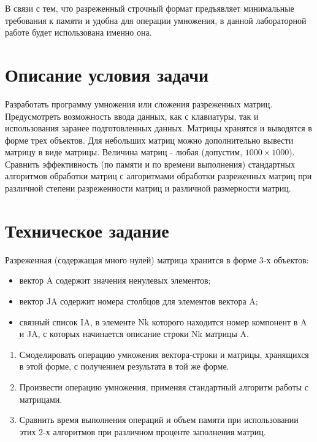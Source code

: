 В связи с тем, что разреженный строчный формат предъявляет минимальные требования к памяти и удобна для операции умножения, в данной лабораторной работе будет использована именно она.

\section{Описание условия задачи}

Разработать  программу  умножения  или  сложения  разреженных  матриц. 
Предусмотреть  возможность  ввода  данных,  как  с  клавиатуры,  так  и  использования 
заранее  подготовленных  данных.  Матрицы  хранятся  и  выводятся  в  форме  трех 
объектов.  Для  небольших  матриц  можно  дополнительно  вывести  матрицу  в  виде 
матрицы. Величина матриц -  любая (допустим, $1000\times1000$). Сравнить эффективность 
(по памяти и по времени выполнения) стандартных алгоритмов обработки матриц с 
алгоритмами обработки разреженных матриц при различной степени разреженности 
матриц и различной размерности матриц.

\section{Техническое задание}

Разреженная (содержащая много нулей) матрица хранится в форме 3-х объектов:
\begin{itemize}[$\bullet$]
	\item вектор A содержит значения ненулевых элементов; 
	\item вектор JA содержит номера столбцов для элементов вектора A; 
	\item связный список IA, в элементе Nk которого находится номер компонент 
	в A и JA, с которых начинается описание строки Nk матрицы A. 
\end{itemize}

\begin{enumerate}
	\item Смоделировать операцию умножения вектора-строки и матрицы, 
	хранящихся в этой форме, с получением результата в той же форме. 
	\item Произвести операцию умножения, применяя стандартный алгоритм работы с 
	матрицами. 
	\item Сравнить время выполнения операций и объем памяти при использовании 
	этих 2-х алгоритмов при различном проценте заполнения матриц. 
\end{enumerate}

